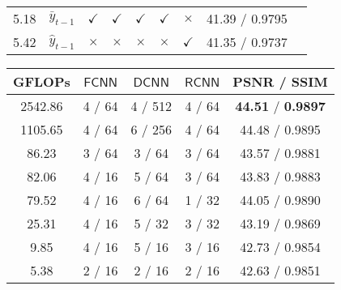 \documentclass[final]{cvpr}
\begin{document}
\begin{table*}[ht!]
\begin{subtable}{\columnwidth}
\begin{tabular}{ccccccccc}
                5.18& $ \bar{y}_{t-1}   $ & $\checkmark$  & $\checkmark$ & $\checkmark$ & $\checkmark$  & $\times$     & 41.39 / 0.9795 \\
                5.42& $ \hat{y}_{t-1}   $ & $\times$      & $\times $    & $\times$     & $\times$      & $\checkmark$ & 41.35 / 0.9737 \\
                \hline              
            \end{tabular}
            \caption{Network structure.}
            \label{tab:structure}
        \end{subtable}
\begin{subtable}{\columnwidth}
            \centering
            \setlength{\tabcolsep}{6pt}
            \begin{tabular}{ccccc}
                \hline
                GFLOPs         & $\mathsf{FCNN}$ & $\mathsf{DCNN}$ & $\mathsf{RCNN}$ & PSNR / SSIM                       \\
                \hline  \hline
                2542.86        & 4 / 64          & 4 / 512         & 4 / 64          & \textbf{44.51} / \textbf{0.9897}  \\
                1105.65        & 4 / 64          & 6 / 256         & 4 / 64          & 44.48 / 0.9895                    \\
                \hline
                86.23          & 3 / 64          & 3 / 64          & 3 / 64          & 43.57 / 0.9881                    \\
                82.06          & 4 / 16          & 5 / 64          & 3 / 64          & 43.83 / 0.9883                    \\
                79.52          & 4 / 16          & 6 / 64          & 1 / 32          & 44.05 / 0.9890                    \\
                25.31          & 4 / 16          & 5 / 32          & 3 / 32          & 43.19 / 0.9869                    \\
                \hline
                9.85           & 4 / 16          & 5 / 16          & 3 / 16          & 42.73 / 0.9854                    \\
                \rowcolor{LightYellow}
                5.38           & 2 / 16          & 2 / 16          & 2 / 16          & 42.63 / 0.9851                    \\
                \hline
            \end{tabular}
            \caption{Number of convolutions / number of filters.}
            \label{tab:distribution}
        \end{subtable}
        \caption{Ablation study of the proposed EMVD evaluated on the raw CRVD dataset~\cite{yue2020supervised}.}
        \label{tab:ablation}
    \end{table*}
    
\end{document}
